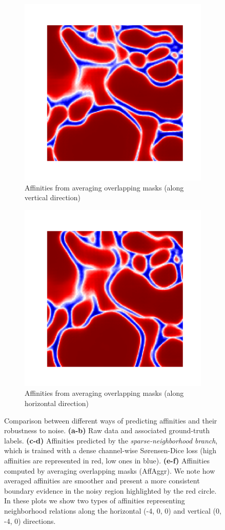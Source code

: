 \begin{figure}[t]
\begin{subfigure}[t]{0.47\linewidth}
\includegraphics[width=0.65\linewidth,trim=1.50in 1.4in 1.4in 1.50in,clip]{./figs/affs_compare/affs3.pdf} %
\caption{\centering Affinities from averaging overlapping masks (along vertical direction)}
\end{subfigure}\hfill
\begin{subfigure}[t]{0.47\textwidth}
\centering
\includegraphics[width=0.65\linewidth,trim=1.50in 1.4in 1.4in 1.50in,clip]{./figs/affs_compare/affs4.pdf} %
\caption{\centering Affinities from averaging overlapping masks (along horizontal direction)}
\end{subfigure}
\caption{Comparison between different ways of predicting affinities and their robustness to noise. \textbf{(a-b)} Raw data and  associated ground-truth labels. \textbf{(c-d)} Affinities predicted by the \emph{sparse-neighborhood branch}, which is trained with a dense channel-wise S\o rensen-Dice loss (high affinities are represented in red, low ones in blue). \textbf{(e-f)} Affinities computed by averaging overlapping masks (AffAggr). We note how averaged affinities are smoother and present a more consistent boundary evidence in the noisy region highlighted by the red circle. In these plots we show two types of affinities representing neighborhood relations along the horizontal (-4, 0, 0) and vertical (0, -4, 0) directions.}\label{fig:affs_comparison}
\end{figure}

